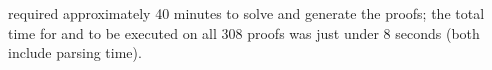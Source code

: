 {%




{\SPASS} required approximately 40 minutes to solve and generate the proofs; the total time for {\GFOLU} and {\FORPI} to be executed on all 308 proofs was just under 8 seconds (both include parsing time).

}
